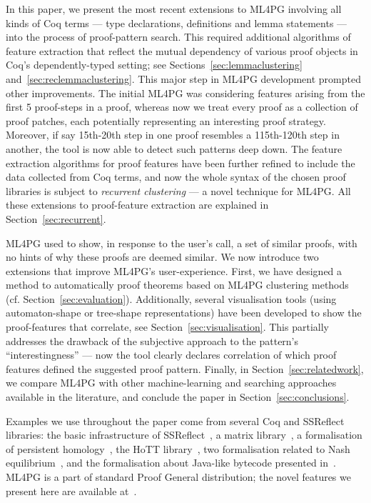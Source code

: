 In this paper, we present the most recent extensions to ML4PG  involving all kinds of Coq terms --- type declarations, definitions and lemma statements --- into the process of proof-pattern search. This required additional algorithms of feature extraction that reflect the mutual dependency of various proof objects in Coq\rq{}s dependently-typed setting; see Sections~\ref{sec:lemmaclustering} and~\ref{sec:reclemmaclustering}.
This major step in ML4PG development prompted other improvements. The initial ML4PG was considering features arising from the first 5 proof-steps in a proof, whereas now we treat every proof as a collection of
proof patches, each potentially
representing an interesting proof strategy. Moreover, if say 15th-20th step in one proof resembles a 115th-120th step in another, the tool is now able to detect such patterns deep down.
The feature extraction algorithms for proof features have been further refined to include the data collected from Coq terms, and now the
whole syntax of the chosen proof libraries is subject
to \emph{recurrent clustering} --- a novel technique for ML4PG.
All these extensions to proof-feature extraction are explained in Section~\ref{sec:recurrent}.

ML4PG used to show, in response to the user's call, a set of similar proofs,
with no hints of why these proofs are deemed similar. We now introduce two extensions that improve ML4PG's user-experience.
First, we have designed a method to automatically proof theorems based on ML4PG clustering methods (cf. Section~\ref{sec:evaluation}). Additionally, several visualisation tools (using automaton-shape or tree-shape representations) have been developed to show the proof-features that correlate, see Section~\ref{sec:visualisation}. This partially addresses the drawback of the subjective approach to
the pattern's ``interestingness'' --- now
the tool clearly declares correlation of which proof features defined the suggested proof pattern.
Finally, in Section~\ref{sec:relatedwork}, we compare ML4PG with other machine-learning and searching approaches available in the literature, and conclude the paper in Section~\ref{sec:conclusions}.


Examples we use throughout the paper come from several Coq and SSReflect libraries: the basic infrastructure of SSReflect~\cite{SSReflect}, a matrix library~\cite{GarillotEtAl09}, a formalisation of persistent homology~\cite{HCMS12}, the HoTT library~\cite{hottbook}, two formalisation related to Nash equilibrium~\cite{Ves06,nash}, and the formalisation about Java-like bytecode presented in~\cite{HK14}. ML4PG is a part of standard Proof General distribution; the novel features we present here are available at~\cite{HK12}.
